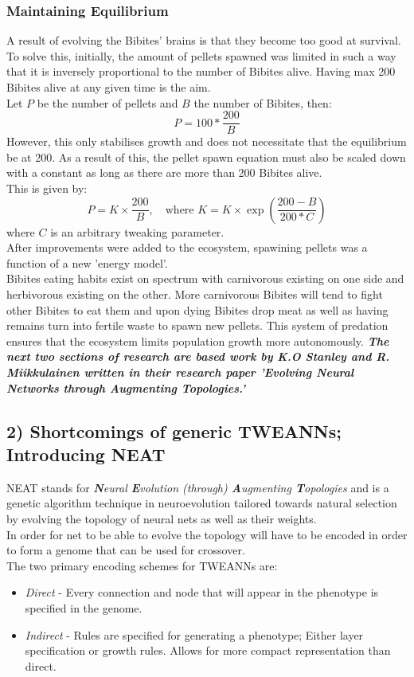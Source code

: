 \documentclass{article}
\begin{document}
\subsubsection*{Maintaining Equilibrium}
A result of evolving the Bibites' brains is that they become too good at survival.
To solve this, initially, the amount of pellets spawned was limited in such a way that it is inversely proportional to the number of Bibites alive. Having max 200 Bibites alive at any given time is the aim.\\ Let $P$ be the number of pellets and $B$ the number of Bibites, then:\\
\begin{equation*}
P= 100*\frac{200}{B}
\end{equation*}
However, this only stabilises growth and does not necessitate that the equilibrium be at 200.
As a result of this, the pellet spawn equation must also be scaled down with a constant as long as there are more than 200 Bibites alive.\\
This is given by:
\begin{equation*}
    P=K\times\frac{200}{B}, \quad\text{where }K=K\times\exp(\frac{200-B}{200*C})
\end{equation*}
where $C$ is an arbitrary tweaking parameter.\\
After improvements were added to the ecosystem, spawining pellets was a function of a new 'energy model'.\\Bibites eating habits exist on spectrum with carnivorous existing on one side and herbivorous existing on the other.
More carnivorous Bibites will tend to fight other Bibites to eat them and upon dying Bibites drop meat as well as having remains turn into fertile waste to spawn new pellets. This system of predation ensures that the ecosystem limits population growth more autonomously.
\newpage
\textbf{\emph{The next two sections of research are based work by K.O Stanley and R. Miikkulainen written in their research paper 'Evolving Neural Networks through Augmenting Topologies.'}}
\subsection*{2) Shortcomings of generic TWEANNs; Introducing NEAT}
NEAT stands for \emph{\textbf{N}eural \textbf{E}volution (through) \textbf{A}ugmenting \textbf{T}opologies} and is a genetic algorithm technique in neuroevolution tailored towards natural selection by evolving the topology of neural nets as well as their weights.\\
In order for net to be able to evolve the topology will have to be encoded in order to form a genome that can be used for crossover.\\
The two primary encoding schemes for TWEANNs are:
\begin{itemize}
    \item \emph{Direct} - Every connection and node that will appear in the phenotype is specified in the genome.
    \item \emph{Indirect} - Rules are specified for generating a phenotype; Either layer specification or growth rules. Allows for more compact representation than direct.
\end{itemize}
\end{document}
